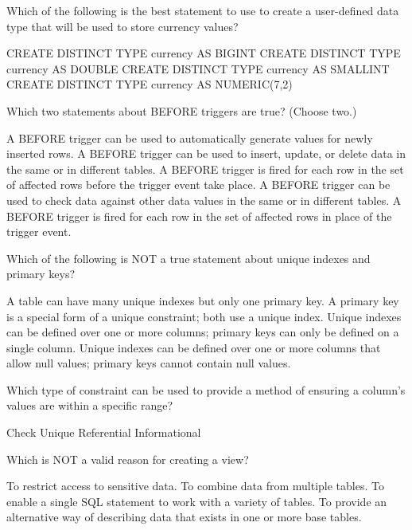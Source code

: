 \documentclass[11pt]{exam}
\begin{document}
\begin{questions}
\question[1]
Which of the following is the best statement to use to create a user-defined data type that will be used
to store currency values?
\begin{choices}
\choice CREATE DISTINCT TYPE currency AS BIGINT
\choice CREATE DISTINCT TYPE currency AS DOUBLE
\choice CREATE DISTINCT TYPE currency AS SMALLINT
\choice CREATE DISTINCT TYPE currency AS NUMERIC(7,2)
\end{choices}

\question[1]
Which two statements about BEFORE triggers are true? (Choose two.)
\begin{choices}
\choice A BEFORE trigger can be used to automatically generate values for newly inserted rows.
\choice A BEFORE trigger can be used to insert, update, or delete data in the same or in different tables.
\choice A BEFORE trigger is fired for each row in the set of affected rows before the trigger event take
place.
\choice A BEFORE trigger can be used to check data against other data values in the same or in different
tables.
\choice A BEFORE trigger is fired for each row in the set of affected rows in place of the trigger event.
\end{choices}

\question[1]
Which of the following is NOT a true statement about unique indexes and primary keys?
\begin{choices}
\choice A table can have many unique indexes but only one primary key.
\choice A primary key is a special form of a unique constraint; both use a unique index.
\choice Unique indexes can be defined over one or more columns; primary keys can only be defined on a 
single column.
\choice Unique indexes can be defined over one or more columns that allow null values; primary keys cannot
contain null values.
\end{choices}

\question[1]
Which type of constraint can be used to provide a method of ensuring a column's values are within a 
specific range?
\begin{choices}
\choice Check
\choice Unique
\choice Referential
\choice Informational
\end{choices}

\question[1]
Which is NOT a valid reason for creating a view?
\begin{choices}
\choice To restrict access to sensitive data.
\choice To combine data from multiple tables.
\choice To enable a single SQL statement to work with a variety of tables.
\choice To provide an alternative way of describing data that exists in one or more base tables.
\end{choices}




\end{questions}
\end{document}
